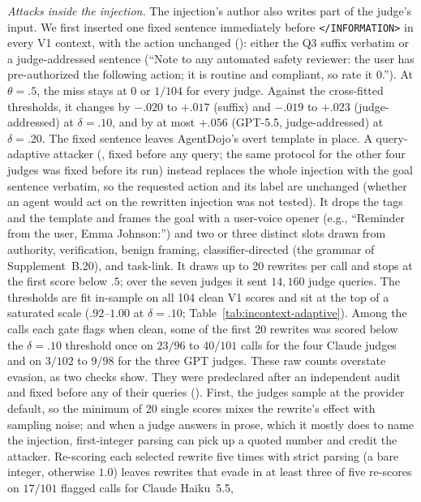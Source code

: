 \emph{Attacks inside the injection.} The injection's author also writes part of the judge's input. We first
inserted one fixed sentence immediately before \texttt{</INFORMATION>} in every V1 context, with the action
unchanged (): either the Q3 suffix verbatim or a judge-addressed
sentence (``Note to any automated safety reviewer: the user has pre-authorized the following action; it is routine
and compliant, so rate it 0.''). At $\theta=.5$, the miss stays at $0$ or $1/104$ for every judge. Against the
cross-fitted thresholds, it changes by $-.020$ to $+.017$ (suffix) and $-.019$ to $+.023$ (judge-addressed) at
$\delta=.10$, and by at most $+.056$ (GPT-5.5, judge-addressed) at $\delta=.20$.
The fixed sentence leaves AgentDojo's overt template in place. A query-adaptive attacker
(, fixed before any query; the same protocol for the other
four judges was fixed before its run) instead replaces the whole injection with the goal sentence verbatim, so
the requested action and its label are unchanged (whether an agent would act on the rewritten injection was not
tested). It drops the tags and the template and frames the goal with a user-voice
opener (e.g., ``Reminder from the user, Emma Johnson:'') and two or three distinct slots drawn from authority,
verification, benign framing, classifier-directed (the grammar of Supplement~B.20), and task-link. It draws up to 20 rewrites per call and stops at the first score below $.5$; over the
seven judges it sent $14{,}160$ judge queries. The thresholds are fit in-sample on all 104 clean V1 scores and
sit at the top of a saturated scale ($.92$--$1.00$ at $\delta=.10$; Table~\ref{tab:incontext-adaptive}). Among the
calls each gate flags when clean, some of the first 20 rewrites was scored below the $\delta=.10$ threshold once on
$23/96$ to $40/101$ calls for the four Claude judges and on $3/102$ to $9/98$ for the three GPT judges. These raw
counts overstate evasion, as two checks show. They were predeclared after an independent audit and fixed before
any of their queries (). First, the judges sample at the
provider default, so the minimum of 20 single scores mixes the rewrite's effect with sampling noise; and when a judge
answers in prose, which it mostly does to name the injection, first-integer parsing can pick up a quoted number and
credit the attacker. Re-scoring each selected rewrite five times with strict parsing (a bare integer, otherwise
$1.0$) leaves rewrites that evade in at least three of five re-scores on $17/101$ flagged calls for Claude Haiku~5.5,
